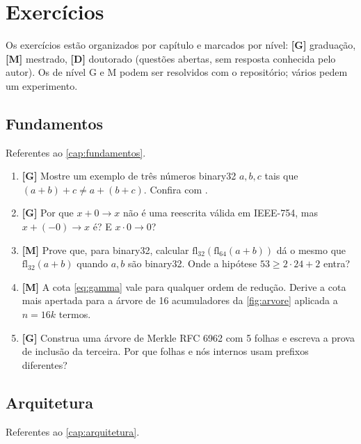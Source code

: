 \chapter{Exercícios}\label{ap:exercicios}

Os exercícios estão organizados por capítulo e marcados por nível: \textbf{[G]} graduação, \textbf{[M]} mestrado, \textbf{[D]} doutorado (questões abertas, sem resposta conhecida pelo autor). Os de nível G e M podem ser resolvidos com o repositório; vários pedem um experimento.

\section*{Fundamentos}
Referentes ao \autoref{cap:fundamentos}.


\begin{enumerate}
  \item \textbf{[G]} Mostre um exemplo de três números binary32 $a, b, c$ tais que $(a+b)+c \neq a+(b+c)$. Confira com .
  \item \textbf{[G]} Por que $x + 0 \to x$ não é uma reescrita válida em IEEE-754, mas $x + (-0) \to x$ é? E $x \cdot 0 \to 0$?
  \item \textbf{[M]} Prove que, para binary32, calcular $\mathrm{fl}_{32}(\mathrm{fl}_{64}(a + b))$ dá o mesmo que $\mathrm{fl}_{32}(a+b)$ quando $a, b$ são binary32. Onde a hipótese $53 \geq 2 \cdot 24 + 2$ entra?
  \item \textbf{[M]} A cota \eqref{eq:gamma} vale para qualquer ordem de redução. Derive a cota mais apertada para a árvore de 16 acumuladores da \autoref{fig:arvore} aplicada a $n = 16k$ termos.
  \item \textbf{[G]} Construa uma árvore de Merkle RFC 6962 com 5 folhas e escreva a prova de inclusão da terceira. Por que folhas e nós internos usam prefixos diferentes?
\end{enumerate}

\section*{Arquitetura}
Referentes ao \autoref{cap:arquitetura}.



